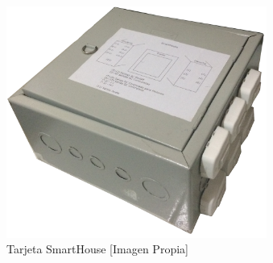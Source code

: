 \begin{frame}[t]
\begin{columns}
\begin{figure}
\end{figure}
\begin{figure}
	\centering
	\caption{Tarjeta SmartHouse [Imagen Propia]}
	\label{fig:caja}
	\includegraphics[width=\linewidth]{Imagenes/caja.jpg}
\end{figure}
\end{columns}
\end{frame}

